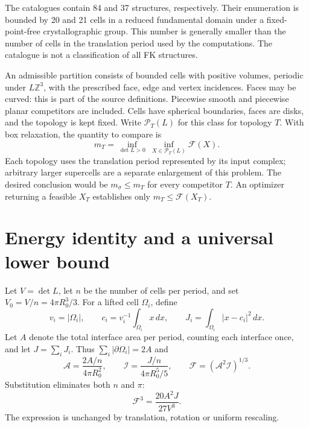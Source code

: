 \documentclass[11pt,a4paper]{report}
\newcommand{\DF}{\mathcal F}
\newcommand{\Ar}{\mathcal A}
\newcommand{\Mo}{\mathcal I}
\begin{document}
The catalogues contain 84 and 37 structures, respectively. Their enumeration
is bounded by 20 and 21 cells in a reduced fundamental domain under a
fixed-point-free crystallographic group. This number is generally smaller
than the number of cells in the translation period used by the computations.
The catalogue is not a classification of all FK structures.

An admissible partition consists of bounded cells with positive volumes,
periodic under $L\mathbb Z^3$, with the prescribed face, edge and vertex
incidences. Faces may be curved: this is part of the source definitions.
Piecewise smooth and piecewise planar competitors are included. Cells have
spherical boundaries, faces are disks, and the topology is kept fixed.
Write $\mathcal P_T(L)$ for this class for topology $T$. With box relaxation,
the quantity to compare is
\[
 m_T=\inf_{\det L>0}\ \inf_{X\in\mathcal P_T(L)}\DF(X).
\]
Each topology uses the translation period represented by its input complex;
arbitrary larger supercells are a separate enlargement of this problem.
The desired conclusion would be $m_\sigma\leq m_T$ for every competitor $T$.
An optimizer returning a feasible $X_T$ establishes only
$m_T\leq\DF(X_T)$.

\section{Energy identity and a universal lower bound}

Let $V=\det L$, let $n$ be the number of cells per period, and set
$V_0=V/n=4\pi R_0^3/3$. For a lifted cell $\Omega_i$, define
\[
 v_i=|\Omega_i|,\qquad
 c_i=v_i^{-1}\int_{\Omega_i}x\,dx,\qquad
 J_i=\int_{\Omega_i}|x-c_i|^2\,dx.
\]
Let $A$ denote the total interface area per period, counting each interface
once, and let $J=\sum_i J_i$. Thus $\sum_i|\partial\Omega_i|=2A$ and
\[
 \Ar=\frac{2A/n}{4\pi R_0^2},\qquad
 \Mo=\frac{J/n}{4\pi R_0^5/5},\qquad
 \DF=(\Ar^2\Mo)^{1/3}.
\]
Substitution eliminates both $n$ and $\pi$:
\begin{equation}\label{eq:energy}
 \boxed{\DF^3=\frac{20A^2J}{27V^3}.}
\end{equation}
The expression is unchanged by translation, rotation or uniform rescaling.
\end{document}
